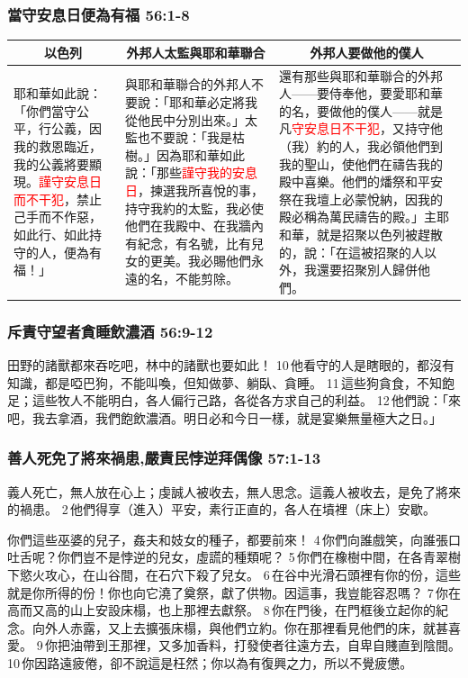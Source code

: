 \subsubsection{當守安息日便為有福 56:1-8}
\begin{table}[H]
\centering
\begin{tabular}{p{3.25cm}|p{}|p{7.250cm}}\hline\hline
\multicolumn{1}{c|}{以色列}&\multicolumn{1}{c|}{外邦人太監與耶和華聯合}&\multicolumn{1}{c}{外邦人要做他的僕人}\\\hline
耶和華如此說：「你們當守公平，行公義，因我的救恩臨近，我的公義將要顯現。\textcolor{red}{謹守安息日而不干犯}，禁止己手而不作惡，如此行、如此持守的人，便為有福！」 
&與耶和華聯合的外邦人不要說：「耶和華必定將我從他民中分別出來。」太監也不要說：「我是枯樹。」因為耶和華如此說：「那些\textcolor{red}{謹守我的安息日}，揀選我所喜悅的事，持守我約的太監，我必使他們在我殿中、在我牆內有紀念，有名號，比有兒女的更美。我必賜他們永遠的名，不能剪除。
&還有那些與耶和華聯合的外邦人——要侍奉他，要愛耶和華的名，要做他的僕人——就是凡\textcolor{red}{守安息日不干犯}，又持守他（我）約的人，我必領他們到我的聖山，使他們在禱告我的殿中喜樂。他們的燔祭和平安祭在我壇上必蒙悅納，因我的殿必稱為萬民禱告的殿。」主耶和華，就是招聚以色列被趕散的，說：「在這被招聚的人以外，我還要招聚別人歸併他們。\\\hline
\end{tabular}
\end{table}


\subsubsection{斥責守望者貪睡飲濃酒 56:9-12}
田野的諸獸都來吞吃吧，林中的諸獸也要如此！ 10 他看守的人是瞎眼的，都沒有知識，都是啞巴狗，不能叫喚，但知做夢、躺臥、貪睡。 11 這些狗貪食，不知飽足；這些牧人不能明白，各人偏行己路，各從各方求自己的利益。 12 他們說：「來吧，我去拿酒，我們飽飲濃酒。明日必和今日一樣，就是宴樂無量極大之日。」

\subsubsection{善人死免了將來禍患,嚴責民悖逆拜偶像 57:1-13}
義人死亡，無人放在心上；虔誠人被收去，無人思念。這義人被收去，是免了將來的禍患。 2 他們得享（進入）平安，素行正直的，各人在墳裡（床上）安歇。

你們這些巫婆的兒子，姦夫和妓女的種子，都要前來！ 4 你們向誰戲笑，向誰張口吐舌呢？你們豈不是悖逆的兒女，虛謊的種類呢？ 5 你們在橡樹中間，在各青翠樹下慾火攻心，在山谷間，在石穴下殺了兒女。 6 在谷中光滑石頭裡有你的份，這些就是你所得的份！你也向它澆了奠祭，獻了供物。因這事，我豈能容忍嗎？ 7 你在高而又高的山上安設床榻，也上那裡去獻祭。 8 你在門後，在門框後立起你的紀念。向外人赤露，又上去擴張床榻，與他們立約。你在那裡看見他們的床，就甚喜愛。 9 你把油帶到王那裡，又多加香料，打發使者往遠方去，自卑自賤直到陰間。 10 你因路遠疲倦，卻不說這是枉然；你以為有復興之力，所以不覺疲憊。

